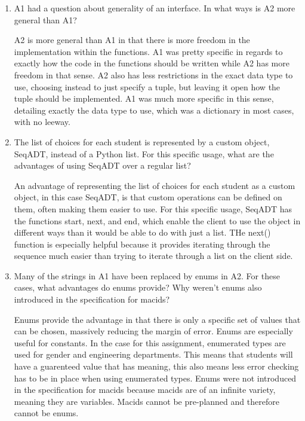 \documentclass[12pt]{article}
\begin{document}
\begin{enumerate}
\item A1 had a question about generality of an interface. In what ways is A2 more general
than A1?

A2 is more general than A1 in that there is more freedom in the implementation within the functions.
A1 was pretty specific in regards to exactly how the code in the functions should be written while A2
has more freedom in that sense. A2 also has less restrictions in the exact data type to use, choosing
instead to just specify a tuple, but leaving it open how the tuple should be implemented. A1 was much
more specific in this sense, detailing exactly the data type to use, which was a dictionary in most cases,
with no leeway.

\item The list of choices for each student is represented by a custom object, SeqADT, instead of a
Python list. For this specific usage, what are the advantages of using SeqADT over a regular list?

An advantage of representing the list of choices for each student as a custom object, in this case SeqADT,
is that custom operations can be defined on them, often making them easier to use. For this specific usage,
SeqADT has the functions start, next, and end, which enable the client to use the object in different ways
than it would be able to do with just a list. THe next() function is especially helpful because it provides
iterating through the sequence much easier than trying to iterate through a list on the client side.

\item Many of the strings in A1 have been replaced by enums in A2. For these cases, what advantages do enums provide?
Why weren't enums also introduced in the specification for macids?

Enums provide the advantage in that there is only a specific set of values that can be chosen, massively reducing 
the margin of error. Enums are especially useful for constants. In the case for this assignment, enumerated types are used for gender and engineering departments.
This means that students will have a guarenteed value that has meaning, this also means less error checking has to be in place
when using enumerated types. Enums were not introduced in the specification for macids because macids are of an infinite
variety, meaning they are variables. Macids cannot be pre-planned and therefore cannot be enums.

\end{enumerate}
\end{document}
